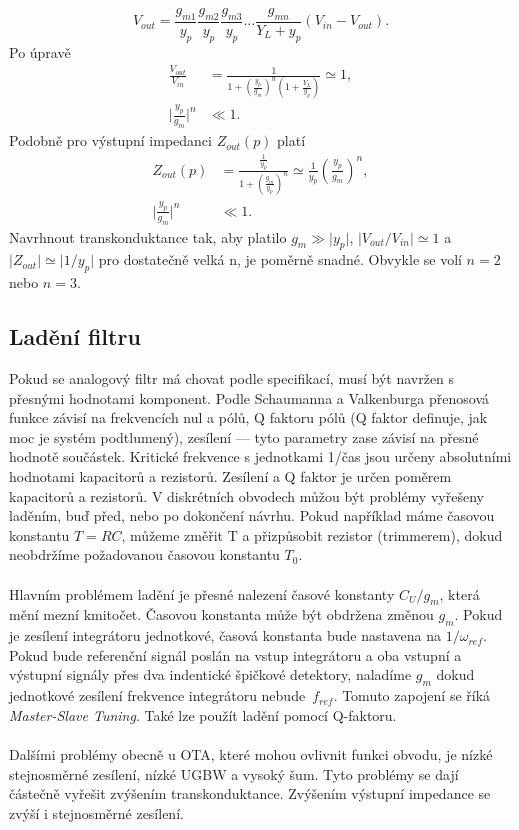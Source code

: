 \begin{equation}
V_{out} = \frac{g_{m1}}{y_p}\frac{g_{m2}}{y_p}\frac{g_{m3}}{y_p} \ldots \frac{g_{mn}}{Y_L + y_p}(V_{in} - V_{out}).
\end{equation}
\noindent Po úpravě
\begin{align}
\frac{V_{out}}{V_{in}} &= \frac{1}{1 + (\frac{y_p}{g_m})^n(1 + \frac{Y_L}{y_p})} \simeq 1,\\
\lvert \frac{y_p}{g_m} \rvert ^n &\ll 1.
\end{align}
\noindent Podobně pro výstupní impedanci $Z_{out}(p)$ platí
\begin{align}
Z_{out}(p) &= \frac{\frac{1}{y_p}}{1 + (\frac{g_m}{y_p})^n} \simeq \frac{1}{y_p}(\frac{y_p}{g_m})^n,\\
\lvert \frac{y_p}{g_m} \rvert ^n &\ll 1.
\end{align}
\noindent Navrhnout transkonduktance tak, aby platilo $g_m \gg \lvert y_p \rvert$, $\lvert V_{out}/V_{in} \rvert  \simeq 1$ a $\lvert Z_{out} \rvert \simeq \lvert 1/y_p \rvert$ pro dostatečně velká n, je poměrně snadné. Obvykle se volí $n = 2$ nebo $n = 3$.
\subsection{Ladění filtru}
\noindent Pokud se analogový filtr má chovat podle specifikací, musí být navržen s přesnými hodnotami komponent. Podle Schaumanna a Valkenburga \cite{13} přenosová funkce závisí na frekvencích nul a pólů, Q faktoru pólů (Q faktor definuje, jak moc je systém podtlumený), zesílení --- tyto parametry zase závisí na přesné hodnotě součástek. Kritické frekvence s jednotkami 1/čas jsou určeny absolutními hodnotami kapacitorů a rezistorů. Zesílení a Q faktor je určen poměrem kapacitorů a rezistorů. V diskrétních obvodech můžou být problémy vyřešeny laděním, buď před, nebo po dokončení návrhu. Pokud například máme časovou konstantu $T = RC$, můžeme změřit T a přizpůsobit rezistor (trimmerem), dokud neobdržíme požadovanou časovou konstantu $T_0$.\\
\\
Hlavním problémem ladění je přesné nalezení časové konstanty $C_U/g_m$, která mění mezní kmitočet. Časovou konstanta může být obdržena změnou $g_m$. Pokud je zesílení integrátoru jednotkové, časová konstanta bude nastavena na $1/\omega _{ref}$. Pokud bude referenční signál poslán na vstup integrátoru a oba vstupní a výstupní signály přes dva indentické špičkové detektory, naladíme $g_m$ dokud jednotkové zesílení frekvence integrátoru nebude~$f_{ref}$. Tomuto zapojení se říká \textit{Master-Slave Tuning}. Také lze použít ladění pomocí Q-faktoru. \\
\\
Dalšími problémy obecně u OTA, které mohou ovlivnit funkci obvodu, je nízké stejnosměrné zesílení, nízké UGBW a vysoký šum. Tyto problémy se dají částečně vyřešit zvýšením transkonduktance. Zvýšením výstupní impedance se zvýší i stejnosměrné zesílení.
